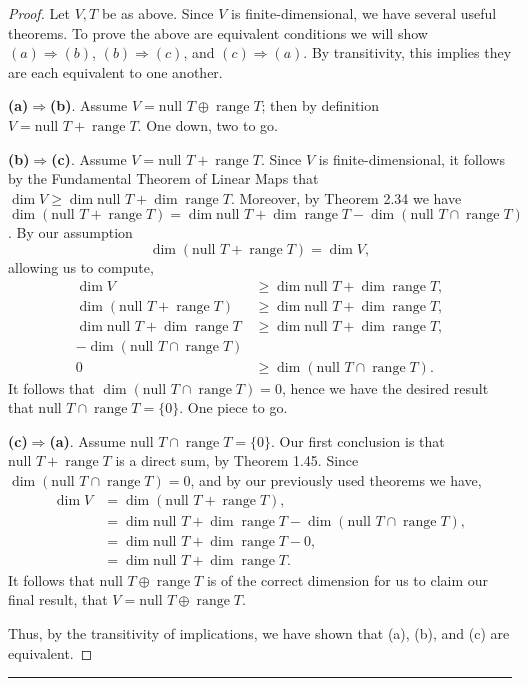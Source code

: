 \documentclass[letterpaper, 12pt]{amsart}
\renewcommand{\null}{\text{null }}					%
\DeclareMathOperator{\range}{\text{range }}			%
\theoremstyle{definition}  							%
\newcommand{\Ra}{\Rightarrow}                   %
\begin{document}
		\begin{proof}
		Let $V,T$ be as above.
		Since $V$ is finite-dimensional, we have several useful theorems.
		To prove the above are equivalent conditions we will show $(a) \Ra (b)$, $(b) \Ra (c)$, and $(c) \Ra (a)$.
		By transitivity, this implies they are each equivalent to one another.

		\textbf{(a)$\Ra$(b)}.
		Assume $V = \null T \oplus \range T$; then by definition $V = \null T + \range T$.
		One down, two to go.

		\textbf{(b)$\Ra$(c)}.
		Assume $V = \null T + \range T$.
		Since $V$ is finite-dimensional, it follows by the Fundamental Theorem of Linear Maps that $\dim V \geq \dim \null T + \dim \range T$.
		Moreover, by Theorem 2.34 we have $\dim(\null T + \range T) = \dim{\null T} + \dim{\range T} - \dim{(\null{T}\cap\range{T})}$.
		By our assumption $$\dim(\null T + \range T) = \dim{V},$$ allowing us to compute,
			\begin{align*}
				\dim V &\geq \dim \null T + \dim \range T, \\
				\dim(\null T + \range T) &\geq \dim \null T + \dim \range T, \\
				\dim{\null T} + \dim{\range T} &\geq \dim \null T + \dim \range T, \\
				- \dim{(\null{T}\cap\range{T})} & \\
				0 &\geq \dim{(\null{T}\cap\range{T})}.
			\end{align*}
		It follows that $\dim{(\null{T}\cap\range{T})} = 0$, hence we have the desired result that $\null T \cap \range T = \{0\}$.
		One piece to go.

		\textbf{(c)$\Ra$(a)}.
		Assume $\null T \cap \range T = \{0\}$.
		Our first conclusion is that $\null T + \range T$ is a direct sum, by Theorem 1.45.
		Since $\dim{(\null T \cap \range T)} = 0$, and by our previously used theorems we have,
			\begin{align*}
			\dim{V} &= \dim(\null T + \range T), \\
			&= \dim{\null T} + \dim{\range T} - \dim{(\null{T}\cap\range{T})}, \\
			&= \dim{\null T} + \dim{\range T} - 0, \\
			&= \dim{\null T} + \dim{\range T}.
			\end{align*}
		It follows that $\null T \oplus \range T$ is of the correct dimension for us to claim our final result, that $V = \null T \oplus \range T$.
		
		Thus, by the transitivity of implications, we have shown that (a), (b), and (c) are equivalent.
		\end{proof}
		\vspace*{2mm}
		\hrule
		\vspace*{2mm}
\end{document}
